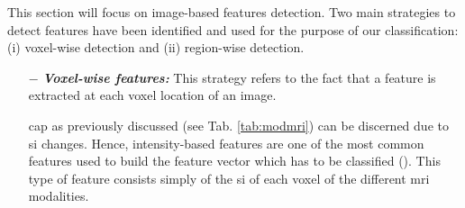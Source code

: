 This section will focus on image-based features detection. Two main strategies to detect features have been identified and used for the purpose of our classification: (i) voxel-wise detection and (ii) region-wise detection.

\begin{enumerate}[leftmargin=*]

\item[$-$] \textbf{\textit{Voxel-wise features:}} This strategy refers to the fact that a feature is extracted at each voxel location of an image.

\ac{cap} as previously discussed (see Tab. \ref{tab:modmri}) can be discerned due to \ac{si} changes. Hence, intensity-based features are one of the most common features used to build the feature vector which has to be classified (\cite{Ampeliotis2007,Ampeliotis2008,Artan2009,Artan2010,Chan2003,Langer2009,Litjens2011,Litjens2012,Litjens2014,Liu2009,Niaf2011,Niaf2012,Viswanath2008a,Viswanath2011}). This type of feature consists simply of the \ac{si} of each voxel of the different \ac{mri} modalities.


\end{enumerate}
